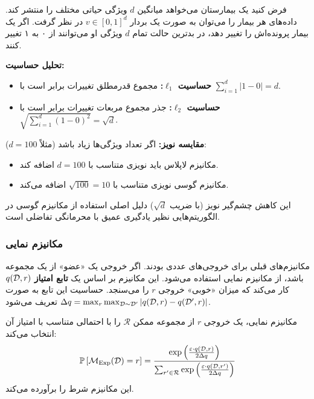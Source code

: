 \begin{مثال}
\label{ex:high-dim-gaussian}
فرض کنید یک بیمارستان می‌خواهد میانگین $d$ ویژگی حیاتی مختلف را منتشر کند. داده‌های هر بیمار را می‌توان به صورت یک بردار $v \in [0, 1]^d$ در نظر گرفت.
اگر یک بیمار پرونده‌اش را تغییر دهد، در بدترین حالت تمام $d$ ویژگی او می‌توانند از ۰ به ۱ تغییر کنند.

\textbf{تحلیل حساسیت:}
\begin{itemize}
    \item \textbf{حساسیت $\ell_1$:} مجموع قدرمطلق تغییرات برابر است با $\sum_{i=1}^d |1-0| = d$.
    \item \textbf{حساسیت $\ell_2$:} جذر مجموع مربعات تغییرات برابر است با $\sqrt{\sum_{i=1}^d (1-0)^2} = \sqrt{d}$.
\end{itemize}

\textbf{مقایسه نویز:}
اگر تعداد ویژگی‌ها زیاد باشد (مثلاً $d=100$):
\begin{itemize}
    \item مکانیزم لاپلاس باید نویزی متناسب با $d=100$ اضافه کند.
    \item مکانیزم گوسی نویزی متناسب با $\sqrt{100}=10$ اضافه می‌کند.
\end{itemize}
این کاهش چشم‌گیر نویز (با ضریب $\sqrt{d}$) دلیل اصلی استفاده از مکانیزم گوسی در الگوریتم‌هایی نظیر یادگیری عمیق با محرمانگی تفاضلی  است.
\end{مثال}


\subsubsection{مکانیزم نمایی}
\label{sec:mech:exponential}

مکانیزم‌های قبلی برای خروجی‌های عددی بودند. اگر خروجی یک «عضو» از یک مجموعه باشد، از مکانیزم نمایی استفاده می‌شود.
این مکانیزم بر اساس یک \textbf{تابع امتیاز} $q(\Dset, r)$ کار می‌کند که میزان «خوبی» خروجی $r$ را می‌سنجد. حساسیت این تابع به صورت $\Del q = \max_{r} \max_{\Dset \sim \Dset'} |q(\Dset, r) - q(\Dset', r)|$ تعریف می‌شود.

\begin{قضیه}
مکانیزم نمایی، یک خروجی $r$ از مجموعه ممکن $\mathcal{R}$ را با احتمالی متناسب با امتیاز آن انتخاب می‌کند:
\begin{equation}
\label{eq:exp-mech}
\mathbb{P}\left[\mech_{\mathrm{Exp}}(\Dset) = r\right] = \frac{\exp \left( \frac{\eps \cdot q(\Dset, r)}{2 \Del q} \right)}{\sum_{r' \in \mathcal{R}} \exp \left( \frac{\eps \cdot q(\Dset, r')}{2 \Del q} \right)}
\end{equation}
این مکانیزم شرط \DP را برآورده می‌کند.
\end{قضیه}

